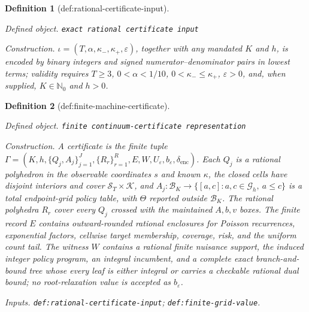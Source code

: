 \documentclass{article}
\newtheorem{definition}{Definition}
\begin{document}
\begin{definition}[def:rational-certificate-input]\label{def:rational-certificate-input}
\par\smallskip\noindent\emph{Defined object.} \texttt{exact rational certificate input}
\par\smallskip\noindent\emph{Construction.} \(\iota=(T,\alpha,\kappa_-,\kappa_+,\varepsilon)\), together with any mandated \(K\) and \(h\), is encoded by binary integers and signed numerator--denominator pairs in lowest terms; validity requires \(T\ge3\), \(0<\alpha<1/10\), \(0<\kappa_-\le\kappa_+\), \(\varepsilon>0\), and, when supplied, \(K\in\mathbb N_0\) and \(h>0\).
\end{definition}

\begin{definition}[def:finite-machine-certificate]\label{def:finite-machine-certificate}
\par\smallskip\noindent\emph{Defined object.} \texttt{finite continuum-\allowbreak{}certificate representation}
\par\smallskip\noindent\emph{Construction.} A certificate is the finite tuple \(\Gamma=(K,h,\{Q_j,A_j\}_{j=1}^J,\{R_r\}_{r=1}^R,E,W,U_\varepsilon,b_\varepsilon,\delta_{\mathrm{enc}})\). Each \(Q_j\) is a rational polyhedron in the observable coordinates \(s\) and known \(\kappa\), the closed cells have disjoint interiors and cover \(\mathcal S_T\times\mathcal K\), and \(A_j:\mathcal B_K\to\{[a,c]:a,c\in\mathcal G_h,\ a\le c\}\) is a total endpoint-grid policy table, with \(\Theta\) reported outside \(\mathcal B_K\). The rational polyhedra \(R_r\) cover every \(Q_j\) crossed with the maintained \(A,b,v\) boxes. The finite record \(E\) contains outward-rounded rational enclosures for Poisson recurrences, exponential factors, cellwise target membership, coverage, risk, and the uniform count tail. The witness \(W\) contains a rational finite nuisance support, the induced integer policy program, an integral incumbent, and a complete exact branch-and-bound tree whose every leaf is either integral or carries a checkable rational dual bound; no root-relaxation value is accepted as \(b_\varepsilon\).
\par\smallskip\noindent\emph{Inputs.} \texttt{def:\allowbreak{}rational-\allowbreak{}certificate-\allowbreak{}input}; \texttt{def:\allowbreak{}finite-\allowbreak{}grid-\allowbreak{}value}.
\end{definition}
\end{document}
